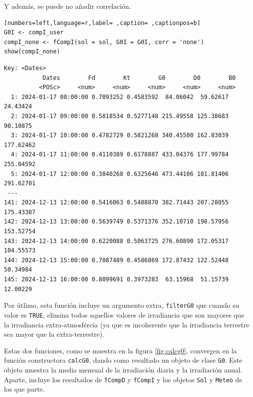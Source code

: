 \begin{itemize}
Y además, se puede no añadir correlación.
\begin{lstlisting}[numbers=left,language=r,label= ,caption= ,captionpos=b]
G0I <- compI_user
compI_none <- fCompI(sol = sol, G0I = G0I, corr = 'none')
show(compI_none)
\end{lstlisting}

\begin{verbatim}
Key: <Dates>
		   Dates        Fd        Kt        G0        D0        B0
		  <POSc>     <num>     <num>     <num>     <num>     <num>
  1: 2024-01-17 08:00:00 0.7093252 0.4583592  84.06042  59.62617  24.43424
  2: 2024-01-17 09:00:00 0.5818534 0.5277148 215.49558 125.38683  90.10875
  3: 2024-01-17 10:00:00 0.4782729 0.5821268 340.45500 162.83039 177.62462
  4: 2024-01-17 11:00:00 0.4110389 0.6178887 433.04376 177.99784 255.04592
  5: 2024-01-17 12:00:00 0.3840268 0.6325646 473.44106 181.81406 291.62701
 ---                                                                      
141: 2024-12-13 12:00:00 0.5416063 0.5488870 382.71443 207.28055 175.43387
142: 2024-12-13 13:00:00 0.5639749 0.5371376 352.10710 198.57956 153.52754
143: 2024-12-13 14:00:00 0.6220088 0.5063725 276.60890 172.05317 104.55573
144: 2024-12-13 15:00:00 0.7087489 0.4586869 172.87432 122.52448  50.34984
145: 2024-12-13 16:00:00 0.8099691 0.3973283  63.15968  51.15739  12.00229
\end{verbatim}

Por útlimo, esta función incluye un argumento extra, \texttt{filterG0} que cuando su valor es \texttt{TRUE}, elimina todos aquellos valores de irradiancia que son mayores que la irradiancia extra-atmosfércia (ya que es incoherente que la irradiancia terrestre sea mayor que la extra-terrestre).
\end{itemize}

Estas dos funciones, como se muestra en la figura \ref{fig:calcg0}, convergen en la función constructora \texttt{calcG0}, dando como resultado un objeto de clase \texttt{G0}. Este objeto muestra la media mensual de la irradiación diaria y la irradiación anual. Aparte, incluye los resultados de \texttt{fCompD} y \texttt{fCompI} y los objetos \texttt{Sol} y \texttt{Meteo} de los que parte.

